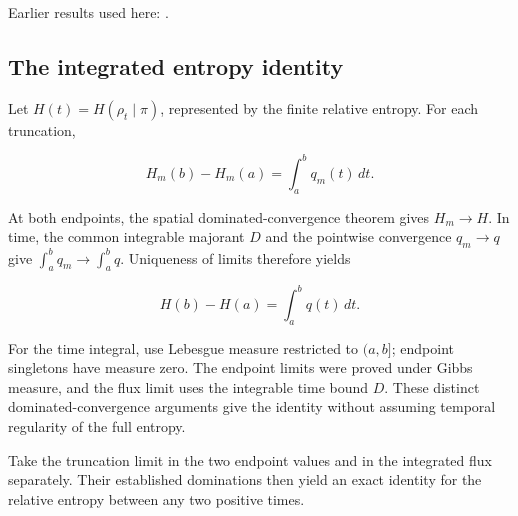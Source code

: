 \documentclass[11pt,a4paper]{report}
\begin{document}
Earlier results used here: \cite[Section~3.26.3]{LangevinLean2026ULASC}.
\subsection{\texorpdfstring{The integrated entropy identity}{The integrated entropy identity}}
\label{report-step-UnadjustedLangevin-LSI-GaussianEntropyIdentity-lean-21}


Let \(H(t)=H(\rho_t\mid\pi)\), represented by the finite relative entropy. For each truncation,

\[H_m(b)-H_m(a)=\int_a^b q_m(t)\,dt.\]

At both endpoints, the spatial dominated-convergence theorem gives \(H_m\to H\). In time, the common integrable majorant \(D\) and the pointwise convergence \(q_m\to q\) give \(\int_a^b q_m\to\int_a^b q\). Uniqueness of limits therefore yields

\[H(b)-H(a)=\int_a^b q(t)\,dt.\]

For the time integral, use Lebesgue measure restricted to \((a,b]\); endpoint singletons have measure zero. The endpoint limits were proved under Gibbs measure, and the flux limit uses the integrable time bound \(D\). These distinct dominated-convergence arguments give the identity without assuming temporal regularity of the full entropy.



Take the truncation limit in the two endpoint values and in the integrated flux separately. Their established dominations then yield an exact identity for the relative entropy between any two positive times.
\end{document}
